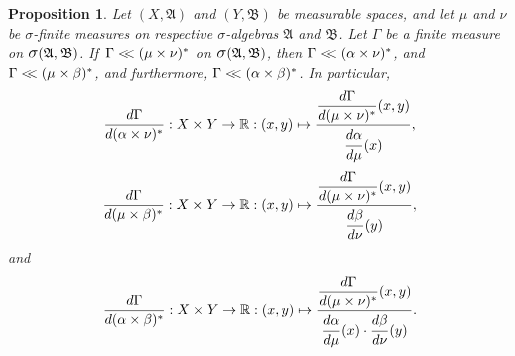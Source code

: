 \documentclass[
twoside=true,
paper=letter,
fontsize=9pt,
pagesize=auto,
leqno,
openany,
headsepline,
overfullrule,
]{scrbook}
\theoremstyle{plain}
\theoremstyle{plain}
\newtheorem{prop}[thm]{Proposition}
\theoremstyle{definition}
\theoremstyle{bfnoteitalic}
\theoremstyle{bfnoteroman}
\newcommand{\sigalg}[1]{\mathfrak{#1}}
\newcommand{\sagb}{\mathop{\hbox{\large{$\sigma$}}}\nolimits}
\newcommand{\textsigma}{\hbox{\large{$\sigma$}}\kern-1pt}
\newcommand{\R}{\mathbb{R}}
\newcommand{\sigmaalgebra}{\sigalg{A}}
\newcommand{\sigmaalgebraii}{\sigalg{B}}
\newcommand{\productsig}[2]{\sagb(#1,#2)}
\newcommand{\lilstrut}{\vphantom{\bigl(}}
\newcommand{\measurespace}{X}
\newcommand{\measurespaceii}{Y}
\newcommand{\mspaceelt}{x}
\newcommand{\mspaceeltii}{y}
\newcommand{\abscont}{\mathrel{< \kern-3.5pt <}}
\newcommand{\measure}{\mu}
\newcommand{\measmu}{\mu}
\newcommand{\measureii}{\nu}
\newcommand{\measnu}{\nu}
\newcommand{\joint}{\Gamma}%
\newcommand{\measonprod}{\Gamma}%
\newcommand{\marginalone}{\alpha}%
\newcommand{\marginaltwo}{\beta}%
\begin{document}
\begin{prop}\label{reference_implies_mixed_and_marginals}
Let
$(\measurespace, \sigmaalgebra)$
and
$(\measurespaceii, \sigmaalgebraii)$
be measurable spaces, and let $\measure$ and $\measureii$
be \textsigma-finite measures on  respective \textsigma-algebras
$\sigmaalgebra$ and $\sigmaalgebraii$.
Let $\measonprod$ be a finite measure on
$\productsig{\sigmaalgebra}{\sigmaalgebraii}$.
If\,
$\measonprod \abscont (\measure\times\measureii)^*$
on
$\productsig{\sigmaalgebra}{\sigmaalgebraii}$,
then 
$\measonprod \abscont (\marginalone\times\measureii)^*$,
and
$\measonprod \abscont (\measure\times\marginaltwo)^*$,
and furthermore,
$\measonprod \abscont (\marginalone\times\marginaltwo)^*$.
In particular,
\[
\frac{d\measonprod}{d(\marginalone\times\measnu)^*}
: \measurespace\times\measurespaceii
\to \R
: (\mspaceelt,\mspaceeltii)\mapsto
\frac{\dfrac{d\joint}{d(\measmu\times\measnu)^*}
(\mspaceelt,\mspaceeltii)}
{\dfrac{d\marginalone\lilstrut}{d\measmu}(\mspaceelt)},
\]
\[
\frac{d\measonprod}{d(\measmu\times\marginaltwo)^*}
: \measurespace\times\measurespaceii
\to \R
: (\mspaceelt,\mspaceeltii)\mapsto
\frac{\dfrac{d\joint}{d(\measmu\times\measnu)^*}
(\mspaceelt,\mspaceeltii)}
{\dfrac{d\marginaltwo\lilstrut}{d\measnu}(\mspaceeltii)},
\]
and
\[
\frac{d\measonprod}{d(\marginalone\times\marginaltwo)^*}
: \measurespace\times\measurespaceii
\to \R
: (\mspaceelt,\mspaceeltii)\mapsto
\frac{\dfrac{d\joint}{d(\measmu\times\measnu)^*}
(\mspaceelt,\mspaceeltii)}
{\dfrac{d\marginalone\lilstrut}{d\measmu}(\mspaceelt)
\cdot
\dfrac{d\marginaltwo\lilstrut}{d\measnu}(\mspaceeltii)}.
\]
\end{prop}
\end{document}
